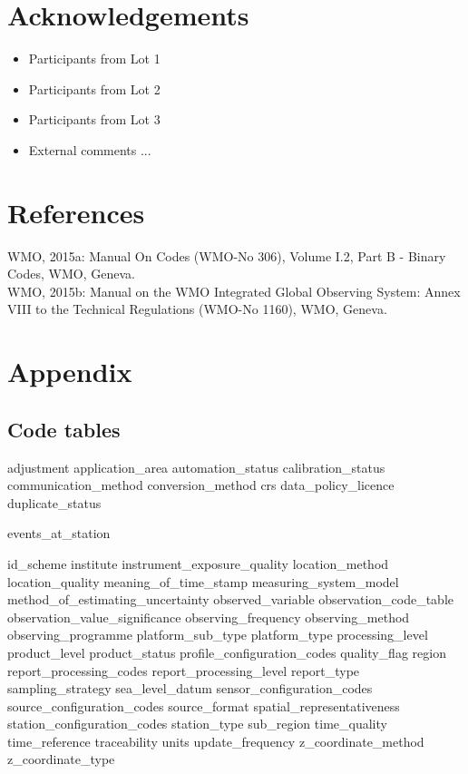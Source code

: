 \documentclass[a4paper]{article}
\begin{document}
\section {Acknowledgements}
\begin{itemize}
\item Participants from Lot 1
\item Participants from Lot 2
\item Participants from Lot 3
\item External comments ...
\end{itemize}

\section {References}

\noindent WMO, 2015a: Manual On Codes (WMO-No 306), Volume I.2, Part B - Binary Codes, WMO, Geneva.\\
\noindent WMO, 2015b:  Manual on the WMO Integrated Global Observing System: Annex VIII to the Technical Regulations (WMO-No 1160), WMO, Geneva.

\section {Appendix}

\subsection {Code tables}

 {adjustment}
 {application_area}
 {automation_status}
 {calibration_status}
 {communication_method}
 {conversion_method}
 {crs}
 {data_policy_licence}
 {duplicate_status}

 {events_at_station}

 {id_scheme}
 {institute}
 {instrument_exposure_quality}
 {location_method}
 {location_quality}
 {meaning_of_time_stamp}
 {measuring_system_model}
 {method_of_estimating_uncertainty}
 {observed_variable}
 {observation_code_table}
 {observation_value_significance}
 {observing_frequency}
 {observing_method}
 {observing_programme}
 {platform_sub_type}
 {platform_type}
 {processing_level}
 {product_level}
 {product_status}
 {profile_configuration_codes}
 {quality_flag}
 {region}
 {report_processing_codes}
 {report_processing_level}
 {report_type}
 {sampling_strategy}
 {sea_level_datum}
 {sensor_configuration_codes}
 {source_configuration_codes}
 {source_format}
 {spatial_representativeness}
 {station_configuration_codes}
 {station_type}
 {sub_region}
 {time_quality}
 {time_reference}
 {traceability}
 {units}
 {update_frequency}
 {z_coordinate_method}
 {z_coordinate_type}

\end{document}

